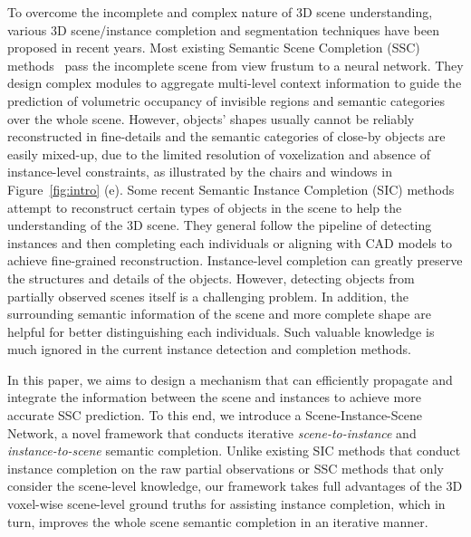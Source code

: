 \documentclass[final]{cvpr}
\begin{document}
To overcome the incomplete and complex nature of 3D scene understanding, various 3D scene/instance completion and segmentation techniques have been proposed in recent years. Most existing Semantic Scene Completion (SSC) methods~\cite{guedes2018semantic,garbade2019two,liu2018see,li2019rgbd,song2017semantic,dourado2019edgenet,liu2018see,li2019rgbd,zhang2018semantic,guo2018view,garbade2019two,zhang2019cascaded-ccpnet,Li2020aicnet} pass the incomplete scene from view frustum to a neural network. They design complex modules to aggregate multi-level context information to guide the prediction of volumetric occupancy of invisible regions and semantic categories over the whole scene. However, objects' shapes usually cannot be reliably reconstructed in fine-details and the semantic categories of close-by objects are easily mixed-up, due to the limited resolution of voxelization and absence of instance-level constraints, as illustrated by the chairs and windows in Figure~\ref{fig:intro} (e). Some recent Semantic Instance Completion (SIC) methods~\cite{hou2020revealnet,hou2019sis,kundu20183d,avetisyan2020scenecad} attempt to reconstruct certain types of objects in the scene to help the understanding of the 3D scene. They general follow the pipeline of detecting instances and then completing each individuals or aligning with CAD models to achieve fine-grained reconstruction. Instance-level completion can greatly preserve the structures and details of the objects. However, detecting objects from partially observed scenes itself is a challenging problem. In addition, the surrounding semantic information of the scene and more complete shape are helpful for better distinguishing each individuals. Such valuable knowledge is much ignored in the current instance detection and completion methods.

In this paper, we aims to design a mechanism that can efficiently propagate and integrate the information between the scene and instances to achieve more accurate SSC prediction. To this end, we introduce a {Scene-Instance-Scene Network}, a novel framework that conducts {iterative} {\textit {scene-to-instance}} and {\textit{instance-to-scene}} semantic completion. Unlike existing SIC methods that conduct instance completion on the raw partial observations or SSC methods that only consider the scene-level knowledge, our framework takes full advantages of the 3D voxel-wise scene-level ground truths for assisting instance completion, which in turn, improves the whole scene semantic completion in an iterative manner. 
\end{document}
